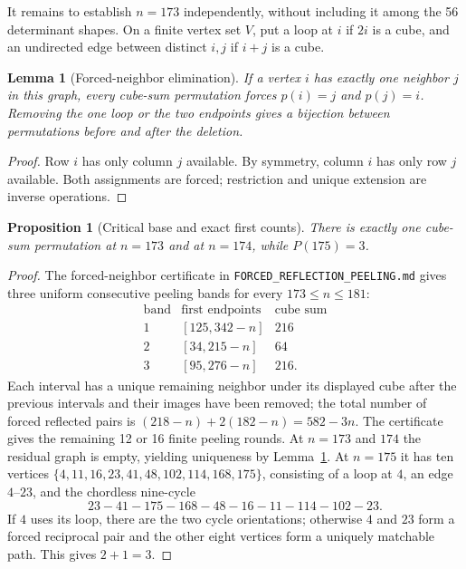 \documentclass[9pt]{extarticle}
\newtheorem{lemma}[theorem]{Lemma}
\newtheorem{proposition}[theorem]{Proposition}
\begin{document}
It remains to establish $n=173$ independently, without including it among the 56 determinant shapes. On a finite vertex set $V$, put a loop at $i$ if $2i$ is a cube, and an undirected edge between distinct $i,j$ if $i+j$ is a cube.
\begin{lemma}[Forced-neighbor elimination]\label{lem:leaf}
If a vertex $i$ has exactly one neighbor $j$ in this graph, every cube-sum permutation forces $p(i)=j$ and $p(j)=i$. Removing the one loop or the two endpoints gives a bijection between permutations before and after the deletion.
\end{lemma}
\begin{proof}
Row $i$ has only column $j$ available. By symmetry, column $i$ has only row $j$ available. Both assignments are forced; restriction and unique extension are inverse operations.
\end{proof}
\begin{proposition}[Critical base and exact first counts]\label{prop:173}
There is exactly one cube-sum permutation at $n=173$ and at $n=174$, while $P(175)=3$.
\end{proposition}
\begin{proof}
The forced-neighbor certificate in \texttt{FORCED\_REFLECTION\_PEELING.md} gives three uniform consecutive peeling bands for every $173\le n\le181$:
\[
\begin{array}{c|c|c}
\text{band}&\text{first endpoints}&\text{cube sum}\\\hline
1 &[125,342-n]&216\\
2 &[34,215-n]&64\\
3 &[95,276-n]&216.
\end{array}
\]
Each interval has a unique remaining neighbor under its displayed cube after the previous intervals and their images have been removed; the total number of forced reflected pairs is $(218-n)+2(182-n)=582-3n$. The certificate gives the remaining 12 or 16 finite peeling rounds. At $n=173$ and $174$ the residual graph is empty, yielding uniqueness by Lemma~\ref{lem:leaf}. At $n=175$ it has ten vertices
$\{4,11,16,23,41,48,102,114,168,175\}$, consisting of a loop at $4$, an edge $4$--$23$, and the chordless nine-cycle
\[
23-41-175-168-48-16-11-114-102-23.
\]
If $4$ uses its loop, there are the two cycle orientations; otherwise $4$ and $23$ form a forced reciprocal pair and the other eight vertices form a uniquely matchable path. This gives $2+1=3$.
\end{proof}
\end{document}
